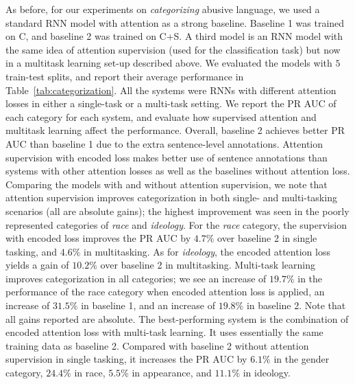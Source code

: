 \documentclass[letterpaper]{article} %
\begin{document}
As before, for our experiments on \textit{categorizing} abusive language,  we used a standard RNN model with attention as a strong baseline. Baseline 1 was trained on C, and baseline 2 was trained on C+S.
A third model is an RNN model with the same idea of attention supervision (used for the classification task) but now in a multitask learning set-up described above.  We evaluated the models with $5$  train-test splits, and report their average performance in Table~\ref{tab:categorization}. All the systems were RNNs with different attention losses in either a single-task or a multi-task setting. We report the PR AUC of each category for each system, and evaluate how supervised attention and multitask learning affect the  performance. Overall, baseline 2 achieves better PR AUC than baseline 1 due to the extra sentence-level annotations. Attention supervision with encoded loss makes better use of sentence annotations than systems with other attention losses as well as the baselines without attention loss.  Comparing the models with and without attention supervision, we note that attention supervision improves categorization in both single- and multi-tasking scenarios (all are absolute gains);  the highest improvement was seen in the poorly represented categories of \textit{race} and \textit{ideology}. For the \textit{race} category, the supervision with encoded loss improves the PR AUC  by $4.7\%$ over baseline 2 in single tasking, and $4.6\%$ in multitasking. As for \textit{ideology}, the encoded attention loss yields a gain of $10.2\%$ over baseline 2 in multitasking.  Multi-task learning improves categorization in all categories; we see an increase of $19.7\%$  in the performance of the race category when encoded attention loss is applied, an increase of $31.5\%$  in baseline 1, and an increase of $19.8\%$ in baseline 2. Note that all gains reported are absolute.  The best-performing system is the combination of encoded attention loss with multi-task learning. It uses essentially the same training data as baseline 2. Compared with baseline 2 without attention supervision in single tasking,  it increases the PR AUC by $6.1\%$ in the gender category, $24.4\%$ in race,  $5.5\%$ in appearance, and  $11.1\%$ in ideology.
\end{document}
